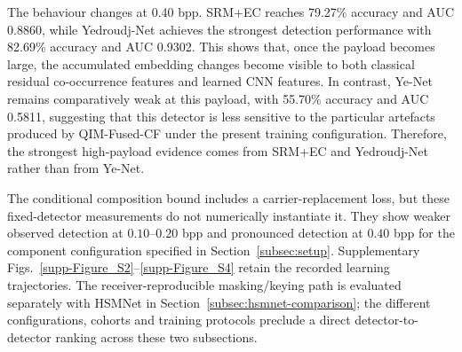 \documentclass[pdflatex,sn-mathphys-num]{sn-jnl}%
\theoremstyle{definition}
\theoremstyle{game}
\theoremstyle{thmstyleone}%
\theoremstyle{thmstyletwo}%
\theoremstyle{thmstylethree}%
\begin{document}
The behaviour changes at 0.40 bpp. SRM+EC reaches 79.27\%
accuracy and AUC 0.8860, while Yedroudj-Net achieves the strongest
detection performance with 82.69\% accuracy and AUC 0.9302. This
shows that, once the payload becomes large, the accumulated embedding
changes become visible to both classical residual co-occurrence features
and learned CNN features. In contrast, Ye-Net remains comparatively
weak at this payload, with 55.70\% accuracy and AUC 0.5811, suggesting
that this detector is less sensitive to the particular artefacts produced by
QIM-Fused-CF under the present training configuration.
Therefore, the strongest high-payload evidence comes from SRM+EC and
Yedroudj-Net rather than from Ye-Net.

The conditional composition bound includes a carrier-replacement loss,
but these fixed-detector measurements do not numerically instantiate it.
They show weaker observed detection at $0.10$--$0.20$ bpp and pronounced
detection at $0.40$ bpp for the component configuration specified in
Section~\ref{subsec:setup}. Supplementary
Figs.~\ref{supp-Figure_S2}--\ref{supp-Figure_S4} retain the recorded
learning trajectories. The receiver-reproducible masking/keying path is evaluated
separately with HSMNet in Section~\ref{subsec:hsmnet-comparison}; the
different configurations, cohorts and training protocols preclude a
direct detector-to-detector ranking across these two subsections.
\end{document}
